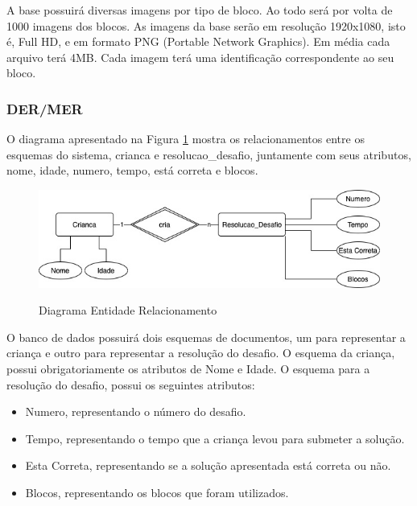         A base possuirá diversas imagens por tipo de bloco. Ao todo será por volta de 1000 imagens dos blocos. As imagens da base serão em resolução 1920x1080, isto é, Full HD, e em formato PNG (Portable Network Graphics). Em média cada arquivo terá 4MB. Cada imagem terá uma identificação correspondente ao seu bloco. 

        
        \subsubsection{DER/MER}
        O diagrama apresentado na Figura \ref{figura:der_mer} mostra os relacionamentos entre os esquemas do sistema, crianca e resolucao\_desafio, juntamente com seus atributos, nome, idade, numero, tempo, está correta e blocos.
        
        \begin{figure}[H]
            \caption{Diagrama Entidade Relacionamento}
            \centering
            \includegraphics[width=\linewidth]{Imagens/cap3/MER_DER.jpg}
            \label{figura:der_mer}
        \end{figure}
        
        O banco de dados possuirá dois esquemas de documentos, um para representar a criança e outro para representar a resolução do desafio.
        O esquema da criança, possui obrigatoriamente os atributos de Nome e Idade.
        O esquema para a resolução do desafio, possui os seguintes atributos:
        
        \begin{itemize}
            \item Numero, representando o número do desafio.
            \item Tempo, representando o tempo que a criança levou para submeter a solução.
            \item Esta Correta, representando se a solução apresentada está correta ou não.
            \item Blocos, representando os blocos que foram utilizados.
        \end{itemize} 
        
